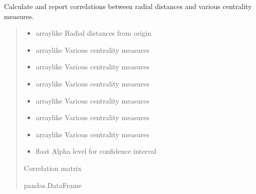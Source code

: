 \documentclass[letterpaper,10pt,english]{sphinxmanual}
\begin{document}
\begin{fulllineitems}
\label{\detokenize{api_reference:id71}}
\pysigstartsignatures
{}
\pysigstopsignatures
\sphinxAtStartPar
Calculate and report correlations between radial distances and various centrality measures.
\begin{quote}\begin{description}
\begin{itemize}
\item {} 
\sphinxAtStartPar
{} \textendash{} array\sphinxhyphen{}like
Radial distances from origin

\item {} 
\sphinxAtStartPar
{} \textendash{} array\sphinxhyphen{}like
Various centrality measures

\item {} 
\sphinxAtStartPar
{} \textendash{} array\sphinxhyphen{}like
Various centrality measures

\item {} 
\sphinxAtStartPar
{} \textendash{} array\sphinxhyphen{}like
Various centrality measures

\item {} 
\sphinxAtStartPar
{} \textendash{} array\sphinxhyphen{}like
Various centrality measures

\item {} 
\sphinxAtStartPar
{} \textendash{} array\sphinxhyphen{}like
Various centrality measures

\item {} 
\sphinxAtStartPar
{} \textendash{} array\sphinxhyphen{}like
Various centrality measures

\item {} 
\sphinxAtStartPar
{} \textendash{} float
Alpha level for confidence interval

\end{itemize}

\sphinxAtStartPar
Correlation matrix

\sphinxAtStartPar
pandas.DataFrame

\end{description}\end{quote}

\end{fulllineitems}
\end{document}
